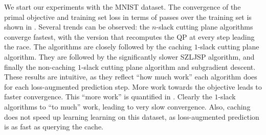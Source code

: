 We start our experiments with the MNIST dataset.
The convergence of the primal objective and training set loss in terms of
passes over the training set is shown in .
Several trends can be observed: the $n$-slack cutting plane algorithms
converge fastest, with the version that recomputes the QP at every step leading
the race. The algorithms are closely followed by the caching $1$-slack cutting
plane algorithm.  They are followed by the significantly slower SZLJSP
algorithm, and finally the non-caching $1$-slack cutting plane algorithm and
subgradient descent.  These results are intuitive, as they reflect ``how much
work'' each algorithm does for each loss-augmented prediction step. More work
towards the objective leads to faster convergence.  This ``more work'' is
quantified in .  Clearly the $1$-slack algorithms to ``to
much'' work, leading to very slow convergence.  Also, caching does not speed up
learning learning on this dataset, as loss-augmented prediction is as fast as
querying the cache.


